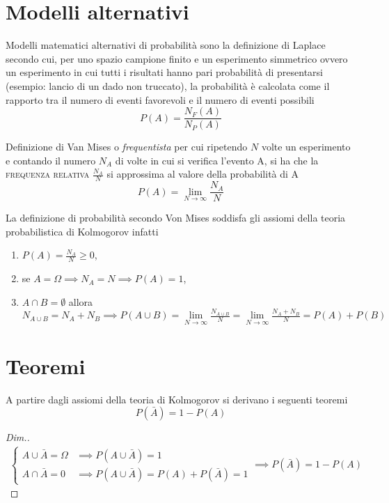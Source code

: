 \section{Modelli alternativi}
Modelli matematici alternativi di probabilità sono la definizione di Laplace secondo cui, per uno spazio campione finito e un esperimento simmetrico ovvero un esperimento in cui tutti i risultati hanno pari probabilità di presentarsi (esempio: lancio di un dado non truccato), la probabilità è calcolata come il rapporto tra il numero di eventi favorevoli e il numero di eventi possibili
\begin{equation}
	P(A)=\frac{N_F(A)}{N_P(A)}
\end{equation}

Definizione di Van Mises o \emph{frequentista} per cui ripetendo $N$ volte un esperimento e contando il numero $N_A$ di volte in cui si verifica l'evento A, si ha che la \textsc{frequenza relativa} $\frac{N_A}{N}$ si approssima al valore della probabilità di A
\begin{equation}
	P(A)=\lim\limits_{N\to\infty}\frac{N_A}{N}
\end{equation}

La definizione di probabilità secondo Von Mises soddisfa gli assiomi della teoria probabilistica di Kolmogorov infatti
\begin{enumerate}
\item $P(A)=\frac{N_A}{N}\geq 0$, 
\item se $A=\Omega\implies N_A=N\implies P(A)=1$,
\item $A\cap B=\emptyset$ allora $N_{A\cup B}=N_A+N_B\implies P(A\cup B)= \lim\limits_{N\to\infty}\frac{N_{A\cup B}}{N}=\lim\limits_{N\to\infty}\frac{N_A+N_B}{N}=P(A)+P(B)$
\end{enumerate}

\section{Teoremi}
A partire dagli assiomi della teoria di Kolmogorov si derivano i seguenti teoremi
\begin{equation}
	P(\bar{A})=1-P(A)
\end{equation}

\begin{proof}[Dim.]
\begin{gather*}
\begin{cases}
A\cup\bar{A}=\Omega & \implies P(A\cup\bar{A})=1 \\
A\cap\bar{A}=0 & \implies P(A\cup\bar{A})=P(A)+P(\bar{A})=1
\end{cases}\implies P(\bar{A})=1-P(A)
\end{gather*}
\end{proof}

